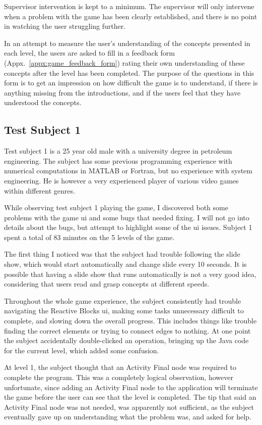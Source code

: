 \noindent
Supervisor intervention is kept to a minimum. The supervisor will only intervene when a problem with the game has been clearly established, and there is no point in watching the user struggling further.

\noindent
In an attempt to measure the user's understanding of the concepts presented in each level, the users are asked to fill in a feedback form (Appx.~\ref{appx:game_feedback_form}) rating their own understanding of these concepts after the level has been completed. The purpose of the questions in this form is to get an impression on how difficult the game is to understand, if there is anything missing from the introductions, and if the users feel that they have understood the concepts.

\subsection{Test Subject 1}
\label{sec:game_testing_subject1}
Test subject 1 is a 25 year old male with a university degree in petroleum engineering. The subject has some previous programming experience with numerical computations in MATLAB or Fortran, but no experience with system engineering. He is however a very experienced player of various video games within different genres.

\noindent
While observing test subject 1 playing the game, I discovered both some problems with the game \gls{ui} and some bugs that needed fixing. I will not go into details about the bugs, but attempt to highlight some of the \gls{ui} issues. Subject 1 spent a total of 83 minutes on the 5 levels of the game.

\noindent
The first thing I noticed was that the subject had trouble following the slide show, which would start automatically and change slide every 10 seconds. It is possible that having a slide show that runs automatically is not a very good idea, considering that users read and grasp concepts at different speeds.

\noindent
Throughout the whole game experience, the subject consistently had trouble navigating the Reactive Blocks \gls{ui}, making some tasks unnecessary difficult to complete, and slowing down the overall progress. This includes things like trouble finding the correct elements or trying to connect edges to nothing. At one point the subject accidentally double-clicked an operation, bringing up the Java code for the current level, which added some confusion.

\noindent
At level 1, the subject thought that an Activity Final node was required to complete the program. This was a completely logical observation, however unfortunate, since adding an Activity Final node to the application will terminate the game before the user can see that the level is completed. The tip that said an Activity Final node was not needed, was apparently not sufficient, as the subject eventually gave up on understanding what the problem was, and asked for help.

